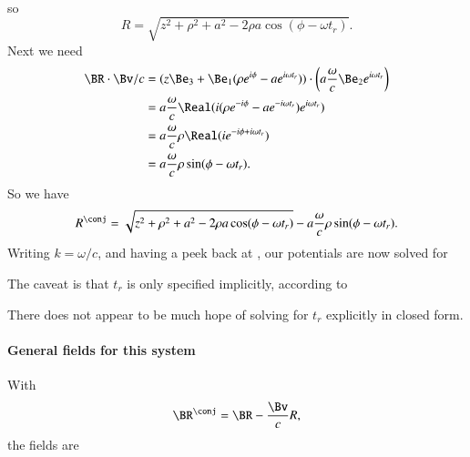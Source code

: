 {\begin{equation}
\begin{aligned}
\end{aligned}
\end{equation}
so
\begin{equation}\label{eqn:relativisticElectrodynamicsExamReflection:130}
R = \sqrt{z^2 + \rho^2 + a^2 - 2 \rho a \cos( \phi - \omega t_r ) }.
\end{equation}
Next we need
%
\begin{equation}\label{eqn:relativisticElectrodynamicsExamReflection:1070}
\begin{aligned}
\BR \cdot \Bv/c
&=
(z \Be_3 + \Be_1 (\rho e^{i \phi} - a e^{i \omega t_r} )) \cdot
\left(a \frac{\omega}{c} \Be_2 e^{i \omega t_r} \right) \\
&=
a \frac{\omega }{c}
\Real(
i (\rho e^{-i \phi} - a e^{-i \omega t_r} ) e^{i \omega t_r} ) \\
&=
a \frac{\omega }{c}
\rho \Real( i e^{-i \phi + i \omega t_r} ) \\
&=
a \frac{\omega }{c}
\rho \sin(\phi - \omega t_r).
\end{aligned}
\end{equation}
%
So we have
%
\begin{equation}\label{eqn:relativisticElectrodynamicsExamReflection:150}
R^\conj = \sqrt{z^2 + \rho^2 + a^2 - 2 \rho a \cos( \phi - \omega t_r ) }
-a \frac{\omega }{c} \rho \sin(\phi - \omega t_r).
\end{equation}
%
Writing \(k = \omega/c\), and having a peek back at , our potentials are now solved for

The caveat is that \(t_r\) is only specified implicitly, according to

There does not appear to be much hope of solving for \(t_r\) explicitly in closed form.
%
%
\paragraph{General fields for this system}
%
With
%
\begin{equation}\label{eqn:relativisticElectrodynamicsExamReflection:540}
\BR^\conj = \BR - \frac{\Bv}{c} R,
\end{equation}
the fields are

}
